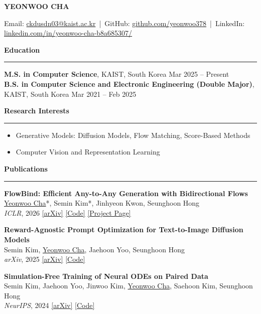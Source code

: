 \documentclass[a4paper,10pt]{article}
\newcommand{\name}[1]{
  \begin{center}
    {\Large \bfseries #1}\\[0.1cm]
  \end{center}
}
\newcommand{\cvsection}[1]{
  \vspace{0.35cm}
  {\normalsize \bfseries #1}\\[-0.35cm]
  \rule{\linewidth}{0.4pt}
  \vspace{0.05cm}
}
\begin{document}
\name{YEONWOO CHA}

\begin{center}
  \small
  Email: \href{mailto:ckdusdn03@kaist.ac.kr}{ckdusdn03@kaist.ac.kr} \,|\,
  GitHub: \href{https://github.com/yeonwoo378}{github.com/yeonwoo378} \,|\,
  LinkedIn: \href{https://www.linkedin.com/in/yeonwoo-cha-b8a685307/}{linkedin.com/in/yeonwoo-cha-b8a685307/}
\end{center}

\cvsection{Education}

\textbf{M.S. in Computer Science}, KAIST, South Korea \hfill Mar 2025 -- Present\\
\textbf{B.S. in Computer Science and Electronic Engineering (Double Major)}, KAIST, South Korea \hfill Mar 2021 -- Feb 2025

\cvsection{Research Interests}

\begin{itemize}[leftmargin=0.5cm, itemsep=2pt, topsep=1pt]
  \item Generative Models: Diffusion Models, Flow Matching, Score-Based Methods
  \item Computer Vision and Representation Learning
\end{itemize}

\cvsection{Publications}

\textbf{FlowBind: Efficient Any-to-Any Generation with Bidirectional Flows}\\
\uline{Yeonwoo Cha}*, Semin Kim*, Jinhyeon Kwon, Seunghoon Hong \\
\textit{ICLR}, 2026 \quad
\href{https://arxiv.org/abs/2512.15420}{[arXiv]}
\href{https://github.com/yeonwoo378/flowbind}{[Code]}
\href{https://yeonwoo378.github.io/official_flowbind}{[Project Page]}

\vspace{0.1cm}

\textbf{Reward-Agnostic Prompt Optimization for Text-to-Image Diffusion Models}\\
Semin Kim, \uline{Yeonwoo Cha}, Jaehoon Yoo, Seunghoon Hong\\
\textit{arXiv}, 2025 \quad
\href{https://arxiv.org/abs/2506.16853}{[arXiv]}
\href{https://github.com/SeminKim/RATTPO}{[Code]}

\vspace{0.1cm}

\textbf{Simulation-Free Training of Neural ODEs on Paired Data}\\
Semin Kim, Jaehoon Yoo, Jinwoo Kim, \uline{Yeonwoo Cha}, Saehoon Kim, Seunghoon Hong\\
\textit{NeurIPS}, 2024 \quad
\href{https://arxiv.org/abs/2410.22918}{[arXiv]}
\href{https://github.com/seminkim/simulation-free-node}{[Code]}
\end{document}
